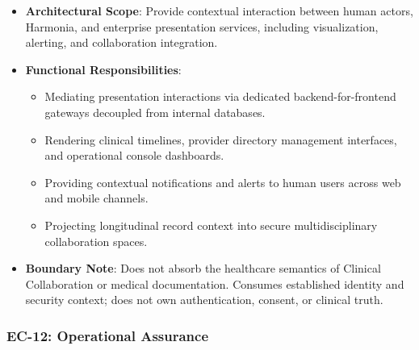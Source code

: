 \begin{itemize}

\item 
\textbf{Architectural Scope}: Provide contextual interaction between human actors, Harmonia, and enterprise presentation services, including visualization, alerting, and collaboration integration.



\item 
\textbf{Functional Responsibilities}:


\begin{itemize}

\item 
Mediating presentation interactions via dedicated backend-for-frontend gateways decoupled from internal databases.



\item 
Rendering clinical timelines, provider directory management interfaces, and operational console dashboards.



\item 
Providing contextual notifications and alerts to human users across web and mobile channels.



\item 
Projecting longitudinal record context into secure multidisciplinary collaboration spaces.



\end{itemize}


\item 
\textbf{Boundary Note}: Does not absorb the healthcare semantics of Clinical Collaboration or medical documentation. Consumes established identity and security context; does not own authentication, consent, or clinical truth.



\end{itemize}
\label{rad:enterprise:202}
\subsubsection*{EC-12: Operational Assurance}
\label{rad:enterprise:203}

